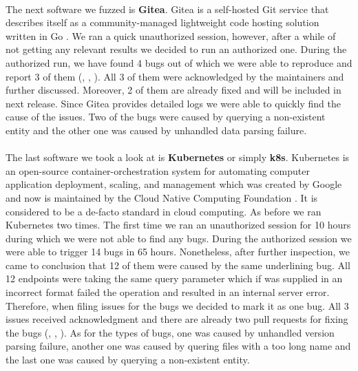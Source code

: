\paragraph{}
The next software we fuzzed is \textbf{Gitea}. Gitea is a self-hosted Git service that describes itself as a community-managed lightweight code hosting solution written in Go \cite{gitea2020web}. We ran a quick unauthorized session, however, after a while of not getting any relevant results we decided to run an authorized one. During the authorized run, we have found 4 bugs out of which we were able to reproduce and report 3 of them (\cite{giteaissue15346github}, \cite{giteaissue15357github}, \cite{giteaissue15356github}). All 3 of them were acknowledged by the maintainers and further discussed. Moreover, 2 of them are already fixed and will be included in next release. Since Gitea provides detailed logs we were able to quickly find the cause of the issues. Two of the bugs were caused by querying a non-existent entity and the other one was caused by unhandled data parsing failure.

\paragraph{}
The last software we took a look at is \textbf{Kubernetes} or simply \textbf{k8s}. Kubernetes is an open-source container-orchestration system for automating computer application deployment, scaling, and management which was created by Google and now is maintained by the Cloud Native Computing Foundation \cite{k8s2021web}. It is considered to be a de-facto standard in cloud computing. As before we ran Kubernetes two times. The first time we ran an unauthorized session for 10 hours during which we were not able to find any bugs. During the authorized session we were able to trigger 14 bugs in 65 hours. Nonetheless, after further inspection, we came to conclusion that 12 of them were caused by the same underlining bug. All 12 endpoints were taking the same query parameter which if was supplied in an incorrect format failed the operation and resulted in an internal server error. Therefore, when filing issues for the bugs we decided to mark it as one bug. All 3 issues received acknowledgment and there are already two pull requests for fixing the bugs (\cite{k8sissue101355github}, \cite{k8sissue101350github}, \cite{k8sissue101348github}). As for the types of bugs, one was caused by unhandled version parsing failure, another one was caused by quering files with a too long name and the last one was caused by querying a non-existent entity.

